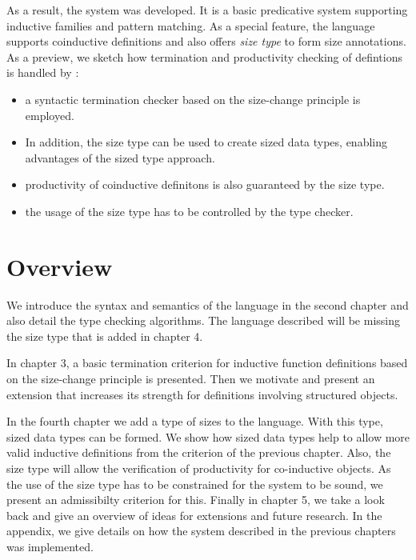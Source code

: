 As a result, the system \mugda was developed.
It is a basic predicative system supporting inductive families and pattern matching. 
As a special feature, the language supports coinductive definitions and also offers \emph{size type} to form size annotations. 
As a preview, we sketch how termination and productivity checking of defintions is handled by \mugda:
\begin{itemize}
\item
a syntactic termination checker based on the size-change principle is employed.
\item
In addition, the size type can be used to create sized data types, enabling advantages of the 
sized type approach.
\item
productivity of coinductive definitons is also guaranteed by the size type.
\item
the usage of the size type has to be controlled by the type checker.
\end{itemize}  
\section{Overview}
We introduce the syntax and semantics of the \mugda language in the second chapter and also detail the type checking algorithms. The language described will be missing the size type that is added in chapter 4. 

In chapter 3, a basic termination criterion for inductive function definitions based on the size-change principle is presented. Then we motivate and present an extension that increases its strength for definitions involving structured objects.

In the fourth chapter we add a type of sizes to the language.
With this type, sized data types can be formed. We show how sized data types help to allow more valid inductive definitions from the criterion of the previous chapter.
Also, the size type will allow the verification of productivity for co-inductive objects.
As the use of the size type has to be constrained for the system to be sound, we present an admissibilty criterion for this.
Finally in chapter 5, we take a look back and give an overview of ideas for extensions and future research.
In the appendix, we give details on how the system described in the previous chapters was implemented.






